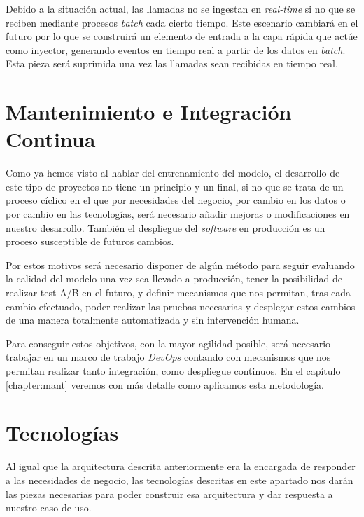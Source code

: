 Debido a la situación actual, las llamadas no se ingestan en \textit{real-time} si no que se reciben mediante procesos \textit{batch} cada cierto tiempo. Este escenario cambiará en el futuro por lo que se construirá un elemento de entrada a la capa rápida que actúe como inyector, generando eventos en tiempo real a partir de los datos en \textit{batch}. Esta pieza será suprimida una vez las llamadas sean recibidas en tiempo real. 



\section{Mantenimiento e Integración Continua}
\label{section:arq:mant}

Como ya hemos visto al hablar del entrenamiento del modelo, el desarrollo de este tipo de proyectos no tiene un principio y un final, si no que se trata de un proceso cíclico en el que por necesidades del negocio, por cambio en los datos o por cambio en las tecnologías, será necesario añadir mejoras o modificaciones en nuestro desarrollo. También el despliegue del \textit{software} en producción es un proceso susceptible de futuros cambios.  



Por estos motivos será necesario disponer de algún método para seguir evaluando la calidad del modelo una vez sea llevado a producción,  tener la posibilidad de realizar test A/B en el futuro, y  definir mecanismos que nos permitan, tras cada cambio efectuado, poder realizar las pruebas necesarias y desplegar estos cambios de una manera totalmente automatizada y sin intervención humana.

Para conseguir estos objetivos, con la mayor agilidad posible, será necesario trabajar en un marco de trabajo \textit{DevOps} contando con mecanismos que nos permitan realizar tanto integración, como despliegue continuos.  En el capítulo \ref{chapter:mant} veremos con más detalle como aplicamos esta metodología.





\section{Tecnologías}
\label{section:arqu:tecn}
Al igual que la arquitectura descrita anteriormente era la encargada de responder a las necesidades de negocio, las tecnologías descritas en este apartado nos darán las piezas necesarias para poder construir esa arquitectura y dar respuesta a nuestro caso de uso. 


